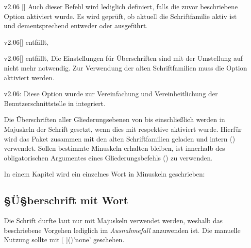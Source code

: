 \begin{Obsolete}{v2.06}
  {[]}
\printobsoletelist%
%
Auch dieser Befehl wird lediglich definiert, falls die zuvor beschriebene 
Option  aktiviert wurde. Es wird geprüft, ob aktuell die 
Schriftfamilie \DIN aktiv ist und dementsprechend entweder  
oder  ausgeführt. 
\end{Obsolete}

\begin{Obsolete}{v2.06}[]
  {}
  {entfällt, }
\begin{Obsolete}{v2.06}[]
  {}
  {entfällt, }
\printobsoletelist%
%
Die Einstellungen für Überschriften sind mit der Umstellung auf \OpenSans nicht 
mehr notwendig. Zur Verwendung der alten Schriftfamilien muss die Option 
 aktiviert werden.
\end{Obsolete}
\end{Obsolete}

\begin{Obsolete}{v2.06:}
  {}
\printobsoletelist%
%
Diese Option wurde zur Vereinfachung und Vereinheitlichung der 
Benutzerschnittstelle in  integriert.
\end{Obsolete}


%
Die Überschriften aller Gliederungsebenen von  bis einschließlich 
 werden in Majuskeln der Schrift \DIN gesetzt, wenn dies 
mit  respektive  aktiviert 
wurde. Hierfür wird das Paket  zusammen mit den alten 
Schriftfamilien geladen und intern () 
verwendet. Sollen bestimmte Minuskeln erhalten bleiben, ist innerhalb des 
obligatorischen Argumentes eines Gliederungsbefehls 
() zu verwenden.
%
\begin{Example}
In einem Kapitel wird ein einzelnes Wort in Minuskeln geschrieben:
\begin{Code}[escapechar=§]
\chapter{§Ü§berschrift mit  Wort}
\end{Code}
\end{Example}
%
Die Schrift \DIN durfte laut \CD nur mit Majuskeln verwendet werden, weshalb 
das beschriebene Vorgehen lediglich im \emph{Ausnahmefall} anzuwenden ist. 
Die manuelle Nutzung sollte mit 
[%
]()'none' geschehen.
%


